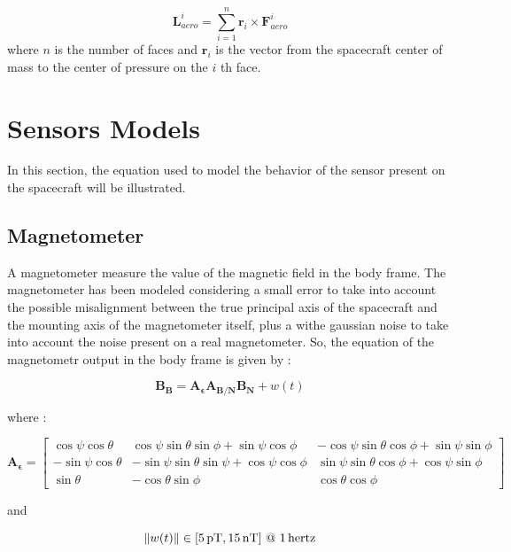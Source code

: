 \documentclass[11pt,a4paper]{report}
\begin{document}
\begin{equation}
 \mathbf{L}_{aero}^{i} = \sum\limits_{i=1}^n  \mathbf{r}_{i} \times \mathbf{F}_{aero}^{i}
\end{equation}
where $n$ is the number of faces and $\mathbf{r}_{i}$ is the vector from the spacecraft center of mass to the center of pressure on the $i$ th face.\\

\section{Sensors Models}
In this section, the equation used to model the behavior of the sensor present on the spacecraft will be illustrated.
\subsection{Magnetometer}
A magnetometer measure the value of the magnetic field in the body frame.
The magnetometer has been modeled considering a small error to take into account the possible misalignment between the true principal axis of the spacecraft and the mounting axis of the magnetometer itself, plus a withe gaussian noise to take into account the noise present on a real magnetometer.
So, the equation of the magnetometr output in the body frame is given by : 

\begin{equation}
 \mathbf{B_{B}} = \mathbf{A_{\epsilon}} \mathbf{A_{B/N}} \mathbf{B_{N}} + w(t)
\end{equation}

where : 

\begin{equation*}
 \mathbf{A_{\epsilon}} =
                                \begin{bmatrix}
                                    \cos\psi\cos\theta & \cos\psi\sin\theta\sin\phi + \sin\psi\cos\phi & -\cos\psi\sin\theta\cos\phi + \sin\psi\sin\phi \\
                                    -\sin\psi\cos\theta & -\sin\psi\sin\theta\sin\psi + \cos\psi\cos\phi & \sin\psi\sin\theta\cos\phi + \cos\psi\sin\phi \\
                                    \sin\theta & -\cos\theta\sin\phi & \cos\theta\cos\phi
                                \end{bmatrix}
\end{equation*}
 
and 

\begin{equation*}
 \norm{w(t)} \in [\SI{5}{\pico\tesla},\SI{15}{\nano\tesla}] \ @ \ \SI{1}{hertz}
\end{equation*}
\end{document}
